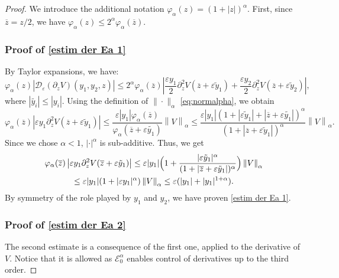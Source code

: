 \documentclass[JEP,XML,SOM,Unicode]{cedram}
\let\mathcal\mathscr
\theoremstyle{plain}
\theoremstyle{definition}
\newcommand{\D}{\mathcal{D}_\eps}
\let\eps\varepsilon
\newcommand{\abs}[1]{\left\lvert#1\right\rvert}
\newcommand{\nalph}[1]{\left\lVert#1\right\rVert_\alpha}
\newcommand{\Eaz}{\mathcal{E}^\alpha_0}
\newcommand{\bz}{\overline{z}}
\newcommand{\vphia}{\varphi_\alpha}
\begin{document}
\begin{proof}
We introduce the additional notation $\vphia(z) = (1+|z|)^\alpha$. First, since \hbox{$\bz=z/2$}, we have $\vphia(z) \leq 2^{\alpha} \vphia(\bz)$.

\subsubsection*{Proof of \eqref{estim der Ea 1}}
By Taylor expansions, we have:
\begin{equation*}
\vphia(z) \left| \D(\partial_z V)(y_1,y_2,z)\right| \leq 2^{\alpha} \vphia(\bz) \left| \dfrac{\eps y _1}{2} \partial^2_z V(\bz+\eps \tilde y_1)+\dfrac{\eps y_2 }{2} \partial^2_z V(\bz+\eps \tilde y_2) \right|,
\end{equation*}
where $\abs{ \tilde{y_i} } \leq \abs{y_i}$.
Using the definition of $\|\cdot \|_\alpha$ \eqref{eq:normalpha}, we obtain
\begin{equation*}
\vphia(\bz) \left| \eps y _1 \partial^2_z V(\bz+\eps \tilde y_1) \right| \leq \dfrac{\eps |y_1 | \vphia(\bz)} {\vphia(\bz+\eps \tilde{y_1}) }\nalph{V} \leq \dfrac{\eps |y_1 | (1+|\eps \tilde y_1| + |\bz + \eps \tilde{y_1} |)^\alpha}{(1+|\bz+\eps \tilde y_1|)^\alpha}\nalph{V}.
\end{equation*}
Since we chose $\alpha < 1$, $|\cdot|^\alpha$ is sub-additive. Thus, we get
\begin{multline*}
\vphia(\bz) \left| \eps y _1 \partial^2_z V(\bz+\eps \tilde y_1) \right| \leq \eps |y_1 | \Bigl (1 + \dfrac{|\eps \tilde y_1|^\alpha}{(1+|\bz+\eps \tilde y_1|)^\alpha} \Bigr)\nalph{V} \\
\leq \eps |y_1 | (1 + |\eps y_1|^\alpha)\nalph{V} \leq \eps (|y_1|+|y_1|^{1+\alpha}).
\end{multline*}
By symmetry of the role played by $y_1$ and $y_2$, we have proven \cref{estim der Ea 1}.

\subsubsection*{Proof of \eqref{estim der Ea 2}}
The second estimate is a consequence of the first one, applied to the derivative of $V$. Notice that it is allowed as $\Eaz$ enables control of derivatives up to the third order.


\end{proof}
\end{document}
